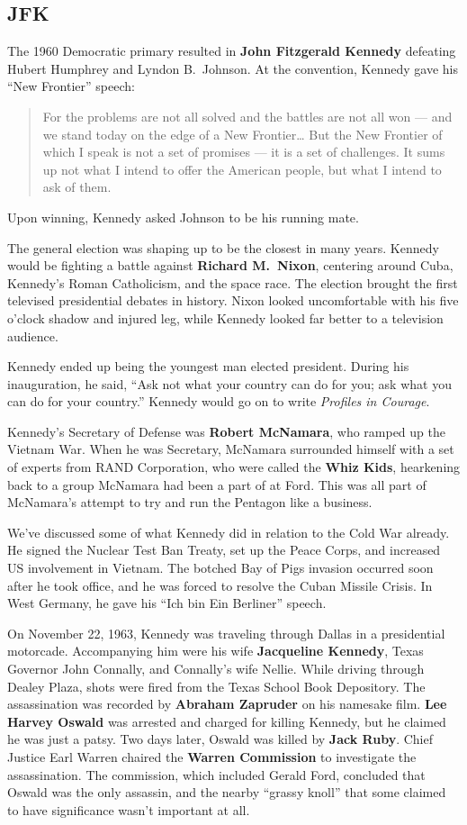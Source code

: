 \subsection*{JFK}

The 1960 Democratic primary resulted in \textbf{John Fitzgerald Kennedy}
defeating Hubert Humphrey and Lyndon B.\ Johnson.
At the convention, Kennedy gave his ``New Frontier'' speech:
\begin{quote}
  For the problems are not all solved and the battles are not all won ---
  and we stand today on the edge of a New Frontier\ldots{}
  But the New Frontier of which I speak is not a set of promises --- it is a set of challenges.
  It sums up not what I intend to offer the American people, but what I intend to ask of them.
\end{quote}
Upon winning, Kennedy asked Johnson to be his running mate.

The general election was shaping up to be the closest in many years.
Kennedy would be fighting a battle against \textbf{Richard M.\ Nixon},
centering around Cuba, Kennedy's Roman Catholicism, and the space race.
The election brought the first televised presidential debates in history.
Nixon looked uncomfortable with his five o'clock shadow and injured leg,
while Kennedy looked far better to a television audience.

Kennedy ended up being the youngest man elected president.
During his inauguration, he said, ``Ask not what your country can do for you; ask what you can do for your country.''
Kennedy would go on to write \textit{Profiles in Courage}.

Kennedy's Secretary of Defense was \textbf{Robert McNamara}, who ramped up the Vietnam War.
When he was Secretary, McNamara surrounded himself with a set of experts from RAND Corporation,
who were called the \textbf{Whiz Kids}, hearkening back to a group McNamara had been a part of at Ford.
This was all part of McNamara's attempt to try and run the Pentagon like a business.

We've discussed some of what Kennedy did in relation to the Cold War already.
He signed the Nuclear Test Ban Treaty, set up the Peace Corps, and increased US involvement in Vietnam.
The botched Bay of Pigs invasion occurred soon after he took office,
and he was forced to resolve the Cuban Missile Crisis.
In West Germany, he gave his ``Ich bin Ein Berliner'' speech.

On November 22, 1963, Kennedy was traveling through Dallas in a presidential motorcade.
Accompanying him were his wife \textbf{Jacqueline Kennedy}, Texas Governor John Connally, and Connally's wife Nellie.
While driving through Dealey Plaza, shots were fired from the Texas School Book Depository.
The assassination was recorded by \textbf{Abraham Zapruder} on his namesake film.
\textbf{Lee Harvey Oswald} was arrested and charged for killing Kennedy,
but he claimed he was just a patsy.
Two days later, Oswald was killed by \textbf{Jack Ruby}.
Chief Justice Earl Warren chaired the \textbf{Warren Commission} to investigate the assassination.
The commission, which included Gerald Ford, concluded that Oswald was the only assassin,
and the nearby ``grassy knoll'' that some claimed to have significance wasn't important at all.


